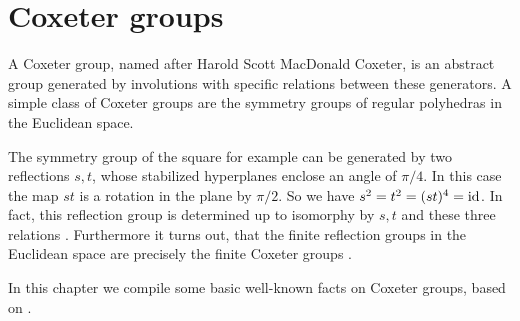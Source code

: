 \section{Coxeter groups}
\label{sec:coxeter-groups}

A Coxeter group, named after Harold Scott MacDonald Coxeter, is an abstract group generated by involutions with specific relations between these generators. A simple class of Coxeter groups are the symmetry groups of regular polyhedras in the Euclidean space.

The symmetry group of the square for example can be generated by two reflections $s,t$, whose stabilized hyperplanes enclose an angle of $\pi / 4$. In this case the map $st$ is a rotation in the plane by $\pi / 2$. So we have $s^2 = t^2 = (st)^4 = \operatorname{id}$. In fact, this reflection group is determined up to isomorphy by $s,t$ and these three relations \cite[Theorem 1.9]{humphreys:coxeter}. Furthermore it turns out, that the finite reflection groups in the Euclidean space are precisely the finite Coxeter groups \cite[Theorem 6.4]{humphreys:coxeter}.

In this chapter we compile some basic well-known facts on Coxeter groups, based on \cite{humphreys:coxeter}.





